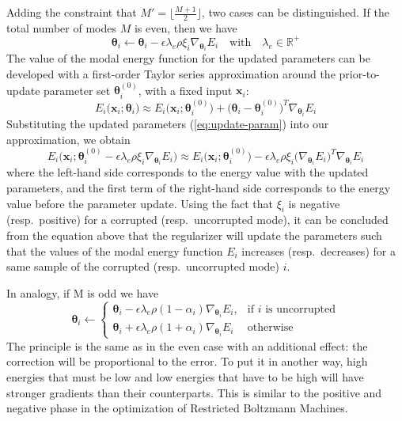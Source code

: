 Adding the constraint that $M' = \lfloor \frac{M+1}{2} \rfloor$, two cases can be distinguished. If the total number of modes $M$ is even, then we have
\begin{equation}
\bm{\theta}_i \leftarrow \bm{\theta}_i - \epsilon\lambda_e\rho\xi_i\nabla_{\bm{\theta}_i}E_i \quad \text{with} \quad \lambda_e \in \mathbb{R}^+
\label{eq:update-param}
\end{equation}
The value of the modal energy function for the updated parameters can be developed with a first-order Taylor series approximation around the prior-to-update parameter set $\bm{\theta}_i^{(0)}$, with a fixed input $\mathbf{x}_i$:
\begin{equation}
E_i\big(\mathbf{x}_i;\bm{\theta}_i\big) \approx E_i\big(\mathbf{x}_i;\bm{\theta}_i^{(0)}\big) + \big(\bm{\theta}_i - \bm{\theta}_i^{(0)}\big)^T\nabla_{\bm{\theta}_i}E_i
\end{equation}
Substituting the updated parameters (\ref{eq:update-param}) into our approximation, we obtain
\begin{equation}
E_i\big(\mathbf{x}_i;\bm{\theta}_i^{(0)} - \epsilon\lambda_e\rho\xi_i\nabla_{\bm{\theta}_i}E_i\big) \approx E_i\big(\mathbf{x}_i;\bm{\theta}_i^{(0)}\big) - \epsilon\lambda_e\rho\xi_i\big(\nabla_{\bm{\theta}_i}E_i\big)^T\nabla_{\bm{\theta}_i}E_i
\end{equation}
where the left-hand side corresponds to the energy value with the updated parameters, and the first term of the right-hand side corresponds to the energy value before the parameter update. Using the fact that $\xi_i$ is negative (resp.\ positive) for a corrupted (resp.\ uncorrupted mode), it can be concluded from the equation above that the regularizer will update the parameters such that the values of the modal energy function $E_i$ increases (resp.\ decreases) for a same sample of the corrupted (resp.\ uncorrupted mode) $i$.

In analogy, if M is odd we have
\begin{equation}
\bm{\theta}_i \leftarrow \begin{cases}
       \bm{\theta}_i - \epsilon\lambda_e\rho(1-\alpha_i)\nabla_{\bm{\theta}_i}E_i, & \text{if $i$ is uncorrupted} \\
       \bm{\theta}_i + \epsilon\lambda_e\rho(1+\alpha_i)\nabla_{\bm{\theta}_i}E_i & \text{otherwise}
    \end{cases}
\end{equation}
The principle is the same as in the even case with an additional effect: the correction will be proportional to the error. To put it in another way, high energies that must be low and low energies that have to be high will have stronger gradients than their counterparts. This is similar to the positive and negative phase in the optimization of Restricted Boltzmann Machines.

